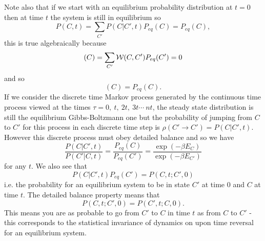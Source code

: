 \documentclass[11pt]{report}
\begin{document}
Note also that if we start with an equilibrium probability distribution at $t=0$ then at time $t$
the system is still in equilibrium so
\begin{equation}
P(C,t) = \sum _{C'} P(C|C',t)P_{eq}(C) = P_{eq}(C),
\end{equation}
this is true algebraically because
\begin{equation}
[{\cal W} P](C) = \sum_{C'} {\cal W}(C,C') P_{eq}(C') = 0
\end{equation}
and so
\begin{equation}
[\exp(t{\cal W})P_{eq}](C) = P_{eq}(C).
\end{equation}
 If we consider the discrete time Markov process generated by the continuous time process
 viewed at the times $\tau =0, \ t, \ 2t, \ 3t \cdots \ nt$, the steady state distribution is still the equilibrium Gibbs-Boltzmann one but the probability of jumping from $C$ to $C'$ for this process in each discrete time step is $\rho(C'\to C') = P(C|C',t)$. However this discrete
 process must obey detailed balance and so we have
 \begin{equation}
 \frac{P(C|C',t)}{P(C'|C,t)} = \frac{P_{eq}(C)}{P_{eq}(C')} = \frac{\exp(-\beta E_C)}{\exp(-\beta E_{C'})}\label{db2}
 \end{equation}
 for any $t$. We also see that
 \begin{equation}
 P(C|C',t)P_{eq}(C') = P(C,t;C',0)
 \end{equation}
 i.e. the probability for an equilibrium system to be in state $C'$ at time 0 and $C$ at time $t$. The detailed balance property means that
 \begin{equation}
  P(C,t;C',0) = P(C',t;C,0).
 \end{equation}
 This means you are as probable to go from $C'$ to $C$ in time $t$ as from $C$ to $C'$ - this corresponds to the statistical invariance of dynamics on upon time reversal for an
 equilibrium system. 
\end{document}

